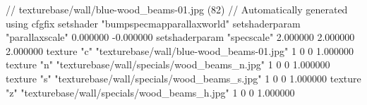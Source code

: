 // texturebase/wall/blue-wood_beams-01.jpg (82)
// Automatically generated using cfgfix
setshader "bumpspecmapparallaxworld"
setshaderparam "parallaxscale" 0.000000 -0.000000
setshaderparam "specscale" 2.000000 2.000000 2.000000
texture "c" "texturebase/wall/blue-wood_beams-01.jpg" 1 0 0 1.000000
texture "n" "texturebase/wall/specials/wood_beams_n.jpg" 1 0 0 1.000000
texture "s" "texturebase/wall/specials/wood_beams_s.jpg" 1 0 0 1.000000
texture "z" "texturebase/wall/specials/wood_beams_h.jpg" 1 0 0 1.000000
